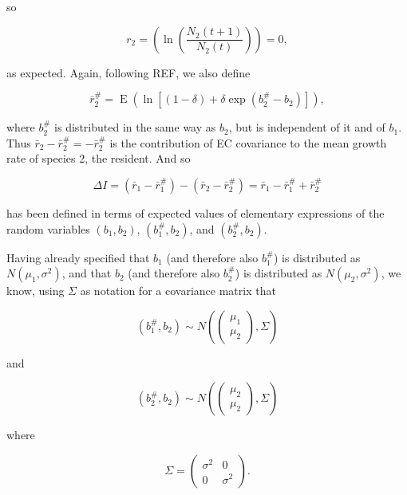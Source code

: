 \documentclass[letterpaper,11pt]{article}
\DeclareMathOperator{\EX}{E}%
\begin{document}
\noindent so

\begin{equation}
r_2=(\ln (\frac{N_2(t+1)}{N_2(t)}))=0, \label{r2_is_zero}
\end{equation}

\noindent as expected. Again, following REF, we also define

\begin{equation}
\bar r_2^\#=\EX(\ln [(1-\delta)+\delta \exp(b_2^\#-b_2)]),  \label{rbar2sharp_E}
\end{equation}

\noindent where $b_2^\#$ is distributed in the same way as $b_2$, but is independent of it and of $b_1$. Thus $\bar r_2- \bar r_2^\# = -\bar r_2^\#$ is the contribution of EC covariance to the mean growth rate of species 2, the resident. And so

\begin{equation}
\Delta I=(\bar r_1 - \bar r_1^\#)-(\bar r_2- \bar r_2^\#)=\bar r_1 - \bar r_1^\#+\bar r_2^\#  \label{DeltaI}
\end{equation}

\noindent has been defined in terms of expected values of elementary expressions of the random variables $(b_1,b_2)$, $(b_1^\#,b_2)$, and $(b_2^\#, b_2)$.

Having already specified that $b_1$ (and therefore also $b_1^\#$) is distributed as $N(\mu_1, \sigma^2)$, and that $b_2$ (and therefore also $b_2^\#$) is distributed as $N(\mu_2, \sigma^2)$, we know, using $\Sigma$ as notation for a covariance matrix that

\begin{equation}
(b_1^\#, b_2) \sim N(\begin{pmatrix} \mu_1\\\mu_2\end{pmatrix}, \Sigma) \label{b1sharpb2_distribution}
\end{equation}

\noindent and 

\begin{equation}
(b_2^\#, b_2) \sim N(\begin{pmatrix} \mu_2\\\mu_2\end{pmatrix}, \Sigma) \label{b2sharpb2_distribution}
\end{equation}

\noindent where

\begin{equation}
\Sigma = \begin{pmatrix} \sigma^2&0\\0&\sigma^2\end{pmatrix}. \label{Sigmamat_cov0}
\end{equation}
\end{document}
